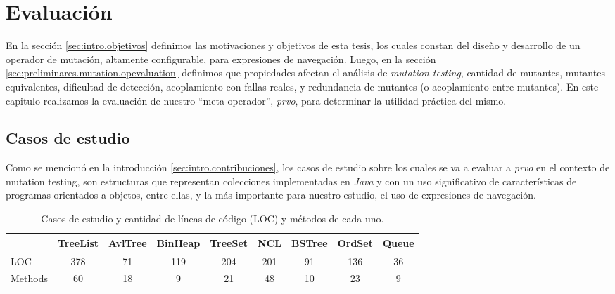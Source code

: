 \chapter[Evaluaci\'on]{Evaluaci\'on}
\label{cap:evaluation}

En la secci\'on \ref{sec:intro.objetivos} definimos las motivaciones y objetivos de esta tesis, los cuales constan del dise\~no y desarrollo de un operador de mutaci\'on, altamente configurable, para expresiones de navegaci\'on. Luego, en la secci\'on \ref{sec:preliminares.mutation.opevaluation} definimos que propiedades afectan el an\'alisis de \emph{mutation testing}, cantidad de mutantes, mutantes equivalentes, dificultad de detecci\'on, acoplamiento con fallas reales, y redundancia de mutantes (o acoplamiento entre mutantes). En este capitulo realizamos la evaluaci\'on de nuestro ``meta-operador'', \emph{prvo}, para determinar la utilidad pr\'actica del mismo.

\section{Casos de estudio}
\label{sec:evaluation.benchmark}

Como se mencion\'o en la introducci\'on \ref{sec:intro.contribuciones}, los casos de estudio sobre los cuales se va a evaluar a \emph{prvo} en el contexto de mutation testing, son estructuras que representan colecciones implementadas en \emph{Java} y con un uso significativo de caracter\'isticas de programas orientados a objetos, entre ellas, y la m\'as importante para nuestro estudio, el uso de expresiones de navegaci\'on. 

\begin{table}[]
	\centering
	\footnotesize
	\def\arraystretch{1.15}
	\setlength\tabcolsep{1.7mm}
	\begin{tabular}{l|cccccccc|}
		\cline{2-9}
		& TreeList & AvlTree & BinHeap & TreeSet & NCL & BSTree & OrdSet & \multicolumn{1}{l|}{Queue} \\ \hline
		\multicolumn{1}{|l|}{LOC} & \multicolumn{1}{c|}{378} & \multicolumn{1}{c|}{71} & \multicolumn{1}{c|}{119} & \multicolumn{1}{c|}{204} & \multicolumn{1}{c|}{201} & \multicolumn{1}{c|}{91} & \multicolumn{1}{c|}{136} & 36 \\ \cline{1-1}
		\multicolumn{1}{|l|}{Methods} & \multicolumn{1}{c|}{60} & \multicolumn{1}{c|}{18} & \multicolumn{1}{c|}{9} & \multicolumn{1}{c|}{21} & \multicolumn{1}{c|}{48} & \multicolumn{1}{c|}{10} & \multicolumn{1}{c|}{23} & 9 \\ \hline
	\end{tabular}
	\caption{Casos de estudio y cantidad de l\'ineas de c\'odigo (LOC) y m\'etodos de cada uno.}
	\label{tables.studyCases}
\end{table}

